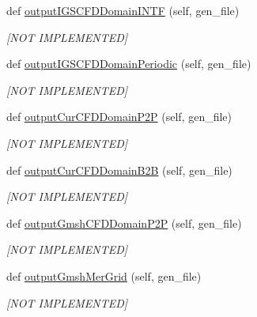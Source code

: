 \begin{DoxyCompactItemize}
def \hyperlink{classbladepro__modules_1_1inputfile__writer_1_1_input_writer_window_aa16a1dab2d93130c1cc0b4c24ec2caef}{output\+I\+G\+S\+C\+F\+D\+Domain\+I\+N\+TF} (self, gen\+\_\+file)
\begin{DoxyCompactList}\small\item\em \mbox{[}N\+OT I\+M\+P\+L\+E\+M\+E\+N\+T\+ED\mbox{]} \end{DoxyCompactList}\item 
def \hyperlink{classbladepro__modules_1_1inputfile__writer_1_1_input_writer_window_a3093ea91273711f4b82aa878c0204407}{output\+I\+G\+S\+C\+F\+D\+Domain\+Periodic} (self, gen\+\_\+file)
\begin{DoxyCompactList}\small\item\em \mbox{[}N\+OT I\+M\+P\+L\+E\+M\+E\+N\+T\+ED\mbox{]} \end{DoxyCompactList}\item 
def \hyperlink{classbladepro__modules_1_1inputfile__writer_1_1_input_writer_window_a3b5fc7f417d1912f563df69560f57c2e}{output\+Cur\+C\+F\+D\+Domain\+P2P} (self, gen\+\_\+file)
\begin{DoxyCompactList}\small\item\em \mbox{[}N\+OT I\+M\+P\+L\+E\+M\+E\+N\+T\+ED\mbox{]} \end{DoxyCompactList}\item 
def \hyperlink{classbladepro__modules_1_1inputfile__writer_1_1_input_writer_window_a925f588daf72fce3ec4e0b89839c290d}{output\+Cur\+C\+F\+D\+Domain\+B2B} (self, gen\+\_\+file)
\begin{DoxyCompactList}\small\item\em \mbox{[}N\+OT I\+M\+P\+L\+E\+M\+E\+N\+T\+ED\mbox{]} \end{DoxyCompactList}\item 
def \hyperlink{classbladepro__modules_1_1inputfile__writer_1_1_input_writer_window_a998cb328088bc95e267cffed35c231ce}{output\+Gmsh\+C\+F\+D\+Domain\+P2P} (self, gen\+\_\+file)
\begin{DoxyCompactList}\small\item\em \mbox{[}N\+OT I\+M\+P\+L\+E\+M\+E\+N\+T\+ED\mbox{]} \end{DoxyCompactList}\item 
def \hyperlink{classbladepro__modules_1_1inputfile__writer_1_1_input_writer_window_a0044216044b48baae08e478a2f358c39}{output\+Gmsh\+Mer\+Grid} (self, gen\+\_\+file)
\begin{DoxyCompactList}\small\item\em \mbox{[}N\+OT I\+M\+P\+L\+E\+M\+E\+N\+T\+ED\mbox{]} \end{DoxyCompactList}\item 

\end{DoxyCompactItemize}
